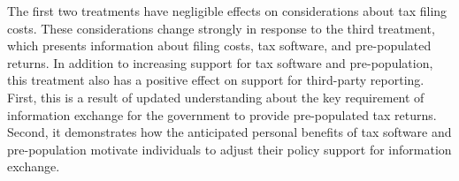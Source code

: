 \documentclass[12pt]{article}
\begin{document}
The first two treatments have negligible effects on considerations about tax filing costs. These considerations change strongly in response to the third treatment, which presents information about filing costs, tax software, and pre-populated returns. In addition to increasing support for tax software and pre-population, this treatment also has a positive effect on support for third-party reporting. First, this is a result of updated understanding about the key requirement of information exchange for the government to provide pre-populated tax returns. Second, it demonstrates how the anticipated personal benefits of tax software and pre-population motivate individuals to adjust their policy support for information exchange. 


\end{document}
